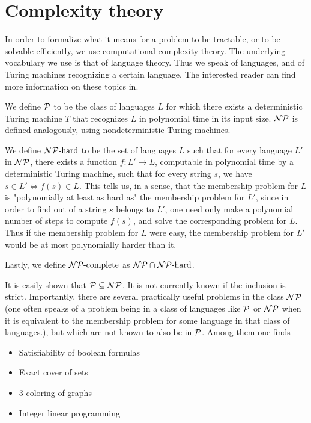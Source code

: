 \section{Complexity theory}

In order to formalize what it means for a problem to be tractable, or to be solvable efficiently, we use computational complexity theory. The underlying vocabulary we use is that of language theory. Thus we speak of languages, and of Turing machines recognizing a certain language. The interested reader can find more information on these topics in\cite{Hopcroft}.

We define $\mathcal{P}$ to be the class of languages $L$ for which there exists a deterministic Turing machine $T$ that recognizes $L$ in polynomial time in its input size. $\mathcal{NP}$ is defined analogously, using nondeterministic Turing machines.

We define $\mathcal{NP}{\text{-hard}}$ to be the set of languages $L$ such that for every language $L'$ in $\mathcal{NP}$, there exists a function $f:L' \to L$, computable in polynomial time by a deterministic Turing machine, such that for every string $s$, we have $s \in L' \iff f(s) \in L$. This tells us, in a sense, that the membership problem for $L$ is "polynomially at least as hard as" the membership problem for $L'$, since in order to find out of a string $s$ belongs to $L'$, one need only make a polynomial number of steps to compute $f(s)$, and solve the corresponding problem for $L$. Thus if the membership problem for $L$ were easy, the membership problem for $L'$ would be at most polynomially harder than it.

Lastly, we define $\mathcal{NP}{\text{-complete}}$ as $\mathcal{NP} \cap \mathcal{NP}{\text{-hard}}$.

It is easily shown that $\mathcal{P} \subseteq \mathcal{NP}$. It is not currently known if the inclusion is strict. Importantly, there are several practically useful problems in the class $\mathcal{NP}$ (one often speaks of a problem being in a class of languages like $\mathcal{P}$ or $\mathcal{NP}$ when it is equivalent to the membership problem for some language in that class of languages.), but which are not known to also be in $\mathcal{P}$. Among them one finds

\begin{itemize}
\item Satisfiability of boolean formulas
\item Exact cover of sets
\item 3-coloring of graphs
\item Integer linear programming
\end{itemize}

